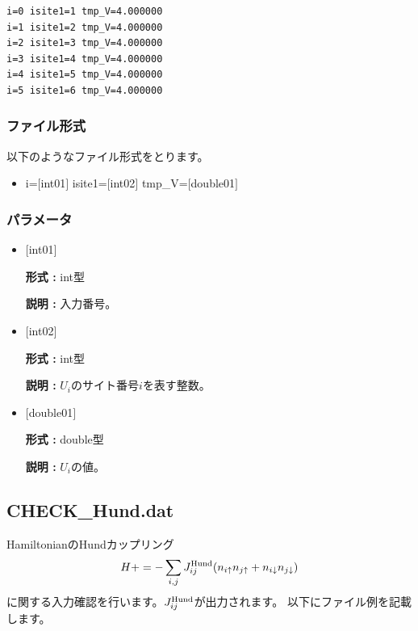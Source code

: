 \begin{minipage}{12.5cm}
\begin{screen}
\begin{verbatim}
i=0 isite1=1 tmp_V=4.000000 
i=1 isite1=2 tmp_V=4.000000 
i=2 isite1=3 tmp_V=4.000000 
i=3 isite1=4 tmp_V=4.000000 
i=4 isite1=5 tmp_V=4.000000 
i=5 isite1=6 tmp_V=4.000000 
\end{verbatim}
\end{screen}
\end{minipage}

\subsubsection{ファイル形式}
以下のようなファイル形式をとります。
 \begin{itemize}
   \item  i=$[$int01$]$ isite1=$[$int02$]$  tmp\_V=$[$double01$]$ 
 \end{itemize}
 
\subsubsection{パラメータ}
 \begin{itemize}

    \item  $[$int01$]$ 
   
    {\bf 形式 :} int型

   {\bf 説明 :} 入力番号。
      
   \item  $[$int02$]$
   
    {\bf 形式 :} int型

    {\bf 説明 :}   $U_i$のサイト番号$i$を表す整数。
    
   \item  $[$double01$]$ 
   
    {\bf 形式 :} double型

   {\bf 説明 :} $U_i$の値。  
\end{itemize}

\newpage
\subsection{CHECK\_Hund.dat}
HamiltonianのHundカップリング
\begin{align}
H += -\sum_{i,j}J_{ij}^{\rm Hund} (n_{i\uparrow}n_{j\uparrow}+n_{i\downarrow}n_{j\downarrow})
\end{align}
に関する入力確認を行います。$J_{ij}^{\rm Hund}$が出力されます。
以下にファイル例を記載します。

